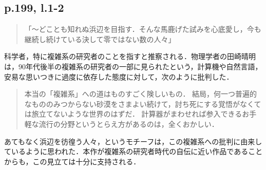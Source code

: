\documentclass[10pt, a5paper, twoside]{ltjsarticle}
\begin{document}
        \subsection{p.199, l.1-2}

            \begin{quote}
                「〜どことも知れぬ浜辺を目指す．そんな馬鹿げた試みを心底愛し，今も継続し続けている決して零ではない数の人々」
            \end{quote}

            科学者，特に複雑系の研究者のことを指すと推察される．物理学者の田崎晴明は，90年代後半の複雑系の研究者の一部に見られたという，計算機や自然言語，安易な思いつきに過度に依存した態度に対して，次のように批判した\cite{tazaki}．

            \begin{quote}
                本当の「複雑系」への道はものすごく険しいもの． 結局，何一つ普遍的なもののみつからない砂漠をさまよい続けて，討ち死にする覚悟がなくては旅立てないような世界のはずだ． 計算器がまわせれば参入できるお手軽な流行の分野というとらえ方があるのは，全くおかしい．
            \end{quote}

            あてもなく浜辺を彷徨う人々，というモチーフは，この複雑系への批判に由来しているように思われた．本作が複雑系の研究者時代の自伝に近い作品であることからも，この見立ては十分に支持される．
\end{document}
